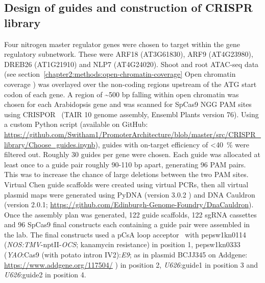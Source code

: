 \documentclass[../main.tex]{subfiles}
\begin{document}
\subsection{Design of guides and construction of CRISPR library}\label{chapter2:methods:design-of-guides}
Four nitrogen master regulator genes were chosen to target within the gene regulatory subnetwork.
These were ARF18 (AT3G61830), ARF9 (AT4G23980), DREB26 (AT1G21910) and NLP7 (AT4G24020).
Shoot and root ATAC-seq data (see section~\ref{chapter2:methods:open-chromatin-coverage} Open chromatin coverage \autocite{potterCytokininModulatesContextdependent2018}) was overlayed over the non-coding regions upstream of the ATG start codon of each gene.
A region of \textasciitilde{}500 bp falling within open chromatin was chosen for each Arabidopsis gene and was scanned for SpCas9 NGG PAM sites using CRISPOR~\autocite{concordetCRISPORIntuitiveGuide2018} (TAIR 10 \autocite{lameschArabidopsisInformationResource2012} genome assembly, Ensembl Plants \autocite{howeEnsemblGenomes20202020} version 76).
Using a custom Python \autocite{pythoncoreteamPythonDynamicOpen2020} script (available on GitHub: \url{https://github.com/Switham1/PromoterArchitecture/blob/master/src/CRISPR_library/Choose_guides.ipynb}), guides with on\hyp{}target efficiency \autocite{doenchOptimizedSgRNADesign2016} of \textless{}\SI{40}{\percent} were filtered out.
Roughly 30 guides per gene were chosen.
Each guide was allocated at least once to a guide pair roughly 90-110 bp apart, generating 96 PAM pairs.
This was to increase the chance of large deletions between the two PAM sites.
Virtual Chen \autocite{chenDynamicImagingGenomic2013} guide scaffolds were created using virtual PCRs, then all virtual plasmid maps were generated using PyDNA (version 3.0.2 \autocite{pereiraPydnaSimulationDocumentation2015}) and DNA Cauldron (version 2.0.1; \url{https://github.com/Edinburgh-Genome-Foundry/DnaCauldron}).
Once the assembly plan was generated, 122 guide scaffolds, 122 sgRNA cassettes and 96 SpCas9 final constructs each containing a guide pair were assembled in the lab.
The final constructs used a pCsA loop acceptor~\autocite{pollakLoopAssemblySimple2018} with pepsw1kn0114 (\textit{NOS:TMV}-nptII-\textit{OCS}; kanamycin resistance) in position 1, pepsw1kn0333 (\textit{YAO}:Cas9 (with potato intron IV2):\textit{E9}; as in plasmid BCJJ345 on Addgene: \url{https://www.addgene.org/117504/} \autocite{castelOptimizationTDNAArchitecture2019}) in position 2, \textit{U626}:guide1 in position 3 and \textit{U626}:guide2 in position 4.
\end{document}
